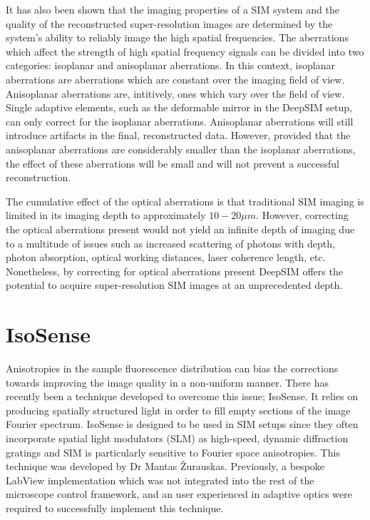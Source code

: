 It has also been shown that the imaging properties of a SIM
system and the quality of the reconstructed super-resolution
images are determined by the system's ability to reliably
image the high spatial frequencies\cite{debarre2008adaptive,thomas2015enhanced}.
The aberrations which affect the strength of high spatial 
frequency signals can be divided into two categories: 
isoplanar and anisoplanar aberrations. In this context, 
isoplanar aberrations are aberrations which are constant 
over the imaging field of view. Anisoplanar aberrations 
are, intitively, ones which vary over the field of view. 
Single adaptive elements, such as the deformable mirror 
in the DeepSIM setup, can only correct for the isoplanar 
aberrations. Anisoplanar aberrations will still introduce 
artifacts in the final, reconstructed data. However, provided 
that the anisoplanar aberrations are considerably smaller than
the isoplanar aberrations, the effect of these aberrations will 
be small and will not prevent a successful
reconstruction\cite{thomas2015enhanced}.

The cumulative effect of the optical aberrations is that
traditional SIM imaging is limited in its imaging depth to
approximately $10-20\mu m$\cite{schermelleh2019super,wu2018faster}. However, 
correcting the optical aberrations present would not yield
an infinite depth of imaging due to a multitude of issues such 
as increased scattering of photons with depth, photon absorption, 
optical working distances, laser coherence length, etc. 
Nonetheless, by correcting for optical aberrations present 
DeepSIM offers the potential to acquire super-resolution SIM 
images at an unprecedented depth.

\section{IsoSense}
\label{sec:isosense}

Anisotropies in the sample fluorescence distribution can bias 
the corrections towards improving the image quality in a 
non-uniform manner. There has recently been a technique developed 
to overcome  this issue; IsoSense\cite{vzurauskas2019isosense}.  
It relies  on producing spatially structured light in order to fill 
empty sections of the image Fourier spectrum. IsoSense is designed 
to be used in SIM setups since 
they often incorporate spatial light modulators (SLM) as high-speed, 
dynamic diffraction  gratings and SIM is particularly sensitive to 
Fourier space anisotropies. This technique was developed by Dr Mantas 
\v{Z}urauskas. Previously, a bespoke LabView implementation which was
not integrated into the rest of the microscope control 
framework, and an user experienced in adaptive optics were required 
to successfully implement this technique.

